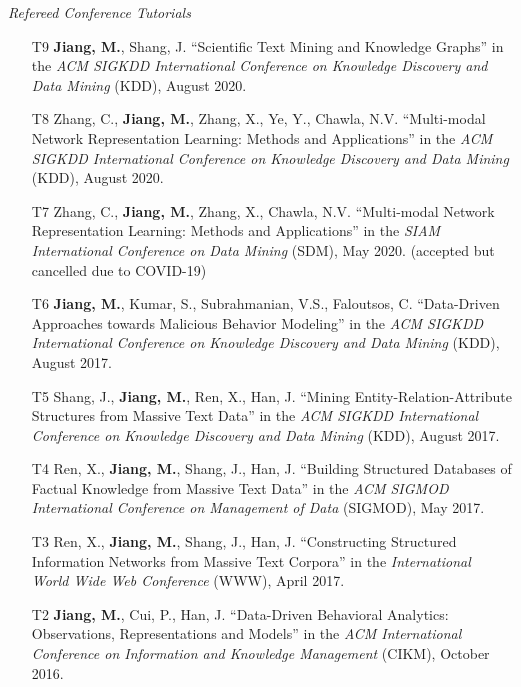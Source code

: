 \documentclass[10pt]{article}
\newenvironment{myindentpar}[1]%
{\begin{list}{}%
         {\setlength{\leftmargin}{#1}}%
         \item[]%
}
{\end{list}}
\newcounter{list}
\begin{document}
\begin{myindentpar}{0.00cm}
\begin{enumerate}[leftmargin=.5cm]
\end{enumerate}

\hspace{-0.25cm}\textit{Refereed Conference Tutorials}

\begin{enumerate}[leftmargin=.5cm]
	
\item[T9] \textbf{Jiang, M.}, Shang, J. ``Scientific Text Mining and Knowledge Graphs'' in the \textit{ACM SIGKDD International Conference on Knowledge Discovery and Data Mining} (KDD), August 2020.
		
\item[T8] Zhang, C., \textbf{Jiang, M.}, Zhang, X., Ye, Y., Chawla, N.V. ``Multi-modal Network Representation Learning: Methods and Applications'' in the \textit{ACM SIGKDD International Conference on Knowledge Discovery and Data Mining} (KDD), August 2020.

\item[T7] Zhang, C., \textbf{Jiang, M.}, Zhang, X., Chawla, N.V. ``Multi-modal Network Representation Learning: Methods and Applications'' in the \textit{SIAM International Conference on Data Mining} (SDM), May 2020. (accepted but cancelled due to COVID-19)

\item[T6] \textbf{Jiang, M.}, Kumar, S., Subrahmanian, V.S., Faloutsos, C. ``Data-Driven Approaches towards Malicious Behavior Modeling'' in the \textit{ACM SIGKDD International Conference on Knowledge Discovery and Data Mining} (KDD), August 2017.

\item[T5] Shang, J., \textbf{Jiang, M.}, Ren, X., Han, J. ``Mining Entity-Relation-Attribute Structures from Massive Text Data'' in the \textit{ACM SIGKDD International Conference on Knowledge Discovery and Data Mining} (KDD), August 2017.

\item[T4] Ren, X., \textbf{Jiang, M.}, Shang, J., Han, J. ``Building Structured Databases of Factual Knowledge from Massive Text Data'' in the \textit{ACM SIGMOD International Conference on Management of Data} (SIGMOD), May 2017.
		
\item[T3] Ren, X., \textbf{Jiang, M.}, Shang, J., Han, J. ``Constructing Structured Information Networks from Massive Text Corpora'' in the \textit{International World Wide Web Conference}  (WWW), April 2017.

\item[T2] \textbf{Jiang, M.}, Cui, P., Han, J. ``Data-Driven Behavioral Analytics: Observations, Representations and Models'' in the \textit{ACM International Conference on Information and Knowledge Management} (CIKM), October 2016.
		

\end{enumerate}
\end{myindentpar}
\end{document}
